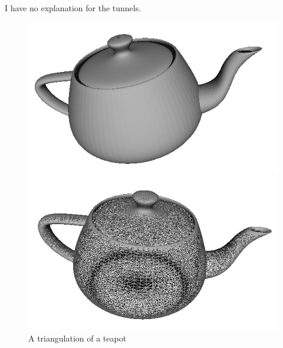\documentclass[11pt,a4paper,twoside, openright]{report}
\begin{document}
I have no explanation for the tunnels.
\begin{figure}[H]
\begin{minipage}[b]{0.45\linewidth}
\center
\includegraphics[scale=0.5]{teapot00.png}
\end{minipage}
\hspace{0.5cm}
\begin{minipage}[b]{0.45\linewidth}
\center
\includegraphics[scale=0.5]{teapot01.png}
\end{minipage}
\caption{A triangulation of a teapot}
\label{fig:teapot}
\end{figure}
\end{document}
